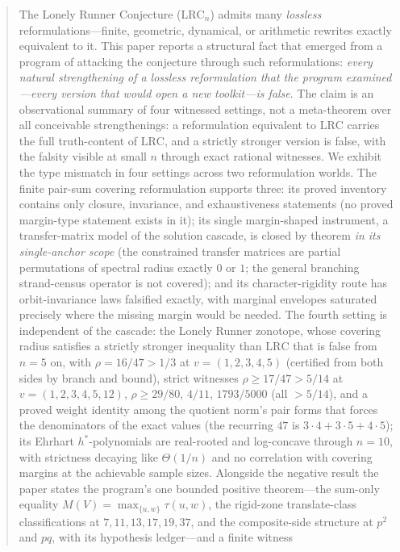 \documentclass[11pt,a4paper]{article}
\numberwithin{equation}{section}
\theoremstyle{plain}
\theoremstyle{definition}
\theoremstyle{remark}
\newcommand{\lrc}{\mathrm{LRC}}
\begin{document}
\begin{abstract}
\noindent
The Lonely Runner Conjecture ($\lrc_n$) admits many \emph{lossless}
reformulations---finite, geometric, dynamical, or arithmetic rewrites
exactly equivalent to it. This paper reports a structural fact that
emerged from a program of attacking the conjecture through such
reformulations: \emph{every natural strengthening of a lossless
reformulation that the program examined---every version that would open a
new toolkit---is false}. The claim is an observational summary of four
witnessed settings, not a meta-theorem over all conceivable
strengthenings: a reformulation equivalent to $\lrc$ carries the full
truth-content of $\lrc$, and a strictly stronger version is false, with
the falsity visible at small $n$ through exact rational witnesses. We
exhibit the type mismatch in four settings across two reformulation
worlds. The finite pair-sum covering reformulation supports three: its
proved inventory contains only closure, invariance, and exhaustiveness
statements (no proved margin-type statement exists in it); its single
margin-shaped instrument, a transfer-matrix model of the solution
cascade, is closed by theorem \emph{in its single-anchor scope} (the
constrained transfer matrices are partial permutations of spectral radius
exactly $0$ or $1$; the general branching strand-census operator is not
covered); and its character-rigidity route has orbit-invariance laws
falsified exactly, with marginal envelopes saturated precisely where the
missing margin would be needed. The fourth setting is independent of the
cascade: the Lonely Runner zonotope, whose covering radius satisfies a
strictly stronger inequality than $\lrc$ that is false from $n=5$ on,
with $\rho=16/47>1/3$ at $v=(1,2,3,4,5)$ (certified from both sides by
branch and bound), strict witnesses $\rho\ge17/47>5/14$ at
$v=(1,2,3,4,5,12)$, $\rho\ge29/80$, $4/11$, $1793/5000$ (all $>5/14$),
and a proved weight identity among the quotient norm's pair forms that
forces the denominators of the exact values (the recurring $47$ is
$3\cdot4+3\cdot5+4\cdot5$); its Ehrhart $h^*$-polynomials are
real-rooted and log-concave through $n=10$, with strictness decaying
like $\Theta(1/n)$ and no correlation with covering margins at the
achievable sample sizes. Alongside the negative result the paper states
the program's one bounded positive theorem---the sum-only equality
$M(V)=\max_{\{u,w\}}\tau(u,w)$, the rigid-zone translate-class
classifications at $7,11,13,17,19,37$, and the composite-side structure
at $p^2$ and $pq$, with its hypothesis ledger---and a finite witness

\end{abstract}
\end{document}

